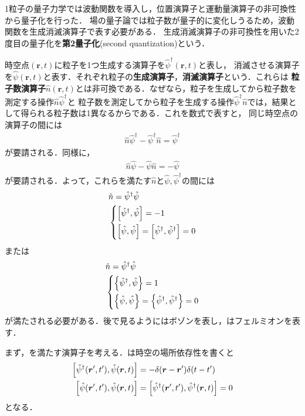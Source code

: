 \documentclass{report}
\begin{document}
1粒子の量子力学では波動関数を導入し，位置演算子と運動量演算子の非可換性から量子化を行った．
場の量子論では粒子数が量子的に変化しうるため，波動関数を生成消滅演算子で表す必要がある．
生成消滅演算子の非可換性を用いた2度目の量子化を\textbf{第2量子化}(second quantization)という．

時空点$(\bm{r},t)$に粒子を1つ生成する演算子を$\hat{\psi}^{\dagger}(\bm{r},t)$と表し，
消滅させる演算子を$\hat{\psi}(\bm{r},t)$と表す．それぞれ粒子の\textbf{生成演算子}，\textbf{消滅演算子}という．これらは
\textbf{粒子数演算子}$\hat{n}(\bm{r},t)$とは非可換である．なぜなら，粒子を生成してから粒子数を測定する操作$\hat{n}\hat{\psi}^{\dagger}$と
粒子数を測定してから粒子を生成する操作$\hat{\psi}^{\dagger}\hat{n}$では，結果として得られる粒子数は1異なるからである．これを数式で表すと，
同じ時空点の演算子の間には
\begin{align}
  \hat{n}\hat{\psi}^{\dagger} - \hat{\psi}^{\dagger}\hat{n} = \hat{\psi}^{\dagger}
\end{align}
が要請される．同様に，
\begin{align}
  \hat{n}\hat{\psi} - \hat{\psi}\hat{n} = -\hat{\psi}
\end{align}
が要請される．よって，これらを満たす$\hat{n}$と$\hat{\psi},\hat{\psi}^{\dagger}$の間には
\begin{align}
  &\hat{n} = \hat{\psi}^{\dagger}\hat{\psi}\\
  &\begin{dcases}
    \qty[\hat{\psi}^{\dagger},\hat{\psi}] = -1\\
    \qty[\hat{\psi},\hat{\psi}] = \qty[\hat{\psi}^{\dagger},\hat{\psi}^{\dagger}] = 0
  \label{boson-com}
  \end{dcases}
\end{align}
または
\begin{align}
  &\hat{n} = \hat{\psi}^{\dagger}\hat{\psi}\\
  &\begin{dcases}
    \qty{\hat{\psi}^{\dagger},\hat{\psi}} = 1\\
    \qty{\hat{\psi},\hat{\psi}} = \qty{\hat{\psi}^{\dagger},\hat{\psi}^{\dagger}} = 0
  \label{fermion-com}
  \end{dcases}
\end{align}
が満たされる必要がある．後で見るようにはボゾンを表し，はフェルミオンを表す．

まず，を満たす演算子を考える．は時空の場所依存性を書くと
\begin{align}
  \qty[\hat{\psi}^\dagger(\bm{r}',t'),\hat{\psi}(\bm{r},t)] &= -\delta(\bm{r} - \bm{r}')\delta(t - t')\\
  \qty[\hat{\psi}(\bm{r}',t'),\hat{\psi}(\bm{r},t)] &= \qty[\hat{\psi}^{\dagger}(\bm{r}',t'),\hat{\psi}^{\dagger}(\bm{r},t)] = 0
\end{align}
となる．
\end{document}

